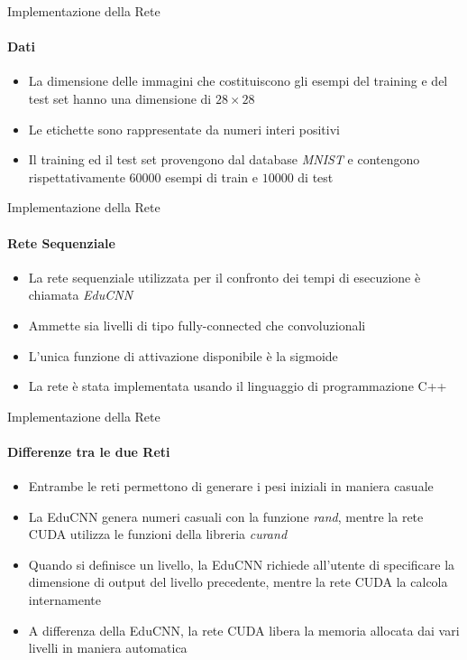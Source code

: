 \documentclass[
 ]{beamer}
\begin{document}
\begin{frame}{Implementazione della Rete}
    \framesubtitle{Dati}
    \begin{itemize} [<+->]
        \setlength\itemsep{3em}
        \item \large La dimensione delle immagini che costituiscono gli esempi del training e del test set hanno una dimensione di $28 \times 28$
        \item \large Le etichette sono rappresentate da numeri interi positivi
        \item \large Il training ed il test set provengono dal database \emph{MNIST} e contengono rispettativamente $60000$ esempi di train e $10000$ di test 
    \end{itemize}
\end{frame}

\begin{frame}{Implementazione della Rete}
    \framesubtitle{Rete Sequenziale}
    \begin{itemize} [<+->]
        \setlength\itemsep{3em}
        \item \large La rete sequenziale utilizzata per il confronto dei tempi di esecuzione è chiamata \emph{EduCNN}
        \item \large Ammette sia livelli di tipo fully-connected che convoluzionali
        \item \large L'unica funzione di attivazione disponibile è la sigmoide
        \item \large La rete è stata implementata usando il linguaggio di programmazione C++  
    \end{itemize}
\end{frame}


\begin{frame}{Implementazione della Rete}
    \framesubtitle{Differenze tra le due Reti}
    \smallskip
    \begin{itemize} [<+->]
        \setlength\itemsep{2em}
        \item \large Entrambe le reti permettono di generare i pesi iniziali in maniera casuale
        \item \large La EduCNN genera numeri casuali con la funzione \emph{rand}, mentre la rete CUDA utilizza le funzioni della libreria \emph{curand}
        \item \large Quando si definisce un livello, la EduCNN richiede all'utente di specificare la dimensione di output del livello precedente, mentre la rete CUDA la calcola internamente
        \item \large A differenza della EduCNN, la rete CUDA libera la memoria allocata dai vari livelli in maniera automatica 
    \end{itemize}     
\end{frame}
\end{document}

